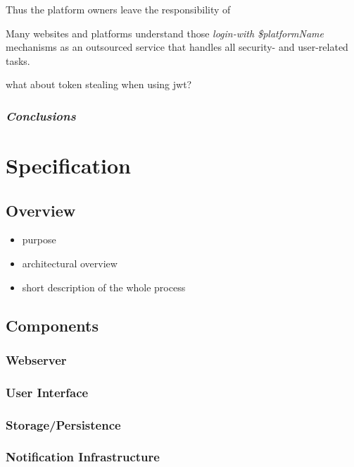 \documentclass[12pt,english,a4paper,titlepage,cleardoublepage=empty,dottedtoc]{report}
\providecommand{\tightlist}{%
  \setlength{\itemsep}{0pt}\setlength{\parskip}{0pt}}
\begin{document}
Thus the platform owners leave the responsibility of

Many websites and platforms understand those \emph{login-with
\$platformName} mechanisms as an outsourced service that handles all
security- and user-related tasks.

what about token stealing when using jwt?

\subsection{\texorpdfstring{\emph{Conclusions}}{Conclusions}}\label{conclusions-1}

\chapter{Specification}\label{specification}

\section{Overview}\label{overview}

\begin{itemize}
\tightlist
\item
  purpose
\item
  architectural overview
\item
  short description of the whole process
\end{itemize}

\section{Components}\label{components}

\subsection{Webserver}\label{webserver}

\subsection{User Interface}\label{user-interface}

\subsection{Storage/Persistence}\label{storagepersistence}

\subsection{Notification
Infrastructure}\label{notification-infrastructure}
\end{document}
